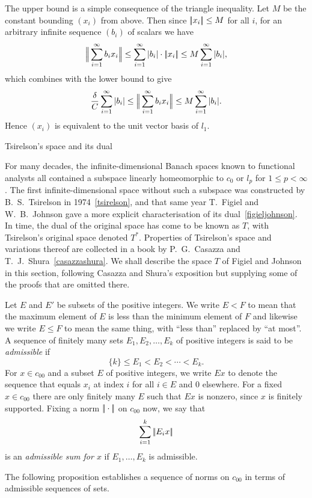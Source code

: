 The upper bound is a simple consequence of the triangle inequality. Let $M$ be the constant bounding $(x_i)$
from above. Then since $|\!|x_i|\!|\le M$ for all $i$, for an arbitrary infinite sequence $(b_i)$ of scalars we have
$$\Big|\!\Big|\sum_{i=1}^\infty b_ix_i\Big|\!\Big|\le \sum_{i=1}^\infty |b_i|\cdot|\!|x_i|\!|\le M \sum_{i=1}^\infty |b_i|,$$
which combines with the lower bound to give
$${\delta\over C} \sum_{i=1}^\infty |b_i| \le \Big|\!\Big|\sum_{i=1}^\infty b_ix_i\Big|\!\Big| \le M \sum_{i=1}^\infty |b_i|.$$
Hence $(x_i)$ is equivalent to the unit vector basis of $l_1$.
\slug

\advsect Tsirelson's space and its dual

For many decades, the infinite-dimensional
Banach spaces known to functional analysts all contained a subspace linearly homeomorphic
to $c_0$ or $l_p$ for $1\le p<\infty$. The first infinite-dimensional space without such a subspace was
constructed by B.~S.~Tsirelson in 1974~\ref{tsirelson},
and that same year T.~Figiel and W.~B.~Johnson gave a more explicit
characterisation of its dual~\ref{figieljohnson}.
In time, the dual of the original space has come to be known as $T$, with
Tsirelson's original space denoted $T^*$. Properties of Tsirelson's space and variations thereof are collected
in a book by P.~G.~Casazza and T.~J.~Shura~\ref{casazzashura}. We shall describe the space $T$ of
Figiel and Johnson in this section, following Casazza and Shura's exposition but supplying some of the proofs
that are omitted there.

Let $E$ and $E'$ be subsets of the positive integers. We write $E<F$ to mean that the maximum element of $E$
is less than the minimum element of $F$ and likewise we write $E\le F$ to mean the same thing, with
``less than'' replaced by ``at most''. A sequence of finitely many sets $E_1,E_2,\ldots,E_k$ of positive integers
is said to be {\it admissible} if
$$ \{k\} \le E_1 < E_2 < \cdots < E_k.$$
For $x\in c_{00}$ and a subset $E$ of positive integers, we write $Ex$ to denote the sequence that equals
$x_i$ at index $i$ for all $i\in E$ and $0$ elsewhere. For a fixed $x\in c_{00}$ there are only
finitely many $E$ such that $Ex$ is nonzero, since $x$ is finitely supported. Fixing a norm $|\!|\cdot|\!|$
on $c_{00}$ now,
we say that
$$\sum_{i=1}^k |\!|E_i x|\!|$$
is an {\it admissible sum for $x$} if $E_1,\ldots,E_k$ is admissible.

The following proposition establishes a sequence of norms on $c_{00}$ in terms of admissible sequences
of sets.

